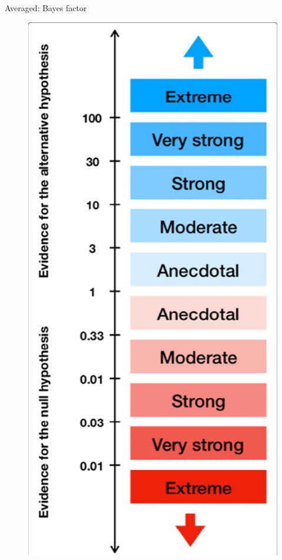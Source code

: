 \documentclass[
aspectratio=169,
14pt,
professionalfonts
]{beamer}
\begin{document}
\begin{frame}{Averaged: Bayes factor}
\begin{minipage}{0.25\textwidth}
\begin{figure}
                \includegraphics[width=\textwidth]{../plots/jeffreys-scale.png}
            \end{figure}
        \end{minipage}
    \end{frame}
\end{document}
